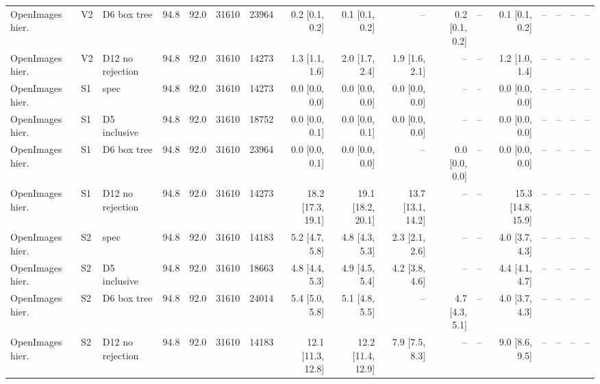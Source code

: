 \begin{tabular}{lllrrrrrrrrrrrrrl}
OpenImages hier. & V2 & D6 box tree & 94.8 & 92.0 & 31610 & 23964 & 0.2 \scriptsize{[0.1, 0.2]} & 0.1 \scriptsize{[0.1, 0.2]} & -- & 0.2 \scriptsize{[0.1, 0.2]} & -- & 0.1 \scriptsize{[0.1, 0.2]} & -- & -- & -- & -- \\
OpenImages hier. & V2 & D12 no rejection & 94.8 & 92.0 & 31610 & 14273 & 1.3 \scriptsize{[1.1, 1.6]} & 2.0 \scriptsize{[1.7, 2.4]} & 1.9 \scriptsize{[1.6, 2.1]} & -- & -- & 1.2 \scriptsize{[1.0, 1.4]} & -- & -- & -- & -- \\
OpenImages hier. & S1 & spec & 94.8 & 92.0 & 31610 & 14273 & 0.0 \scriptsize{[0.0, 0.0]} & 0.0 \scriptsize{[0.0, 0.0]} & 0.0 \scriptsize{[0.0, 0.0]} & -- & -- & 0.0 \scriptsize{[0.0, 0.0]} & -- & -- & -- & -- \\
OpenImages hier. & S1 & D5 inclusive & 94.8 & 92.0 & 31610 & 18752 & 0.0 \scriptsize{[0.0, 0.1]} & 0.0 \scriptsize{[0.0, 0.1]} & 0.0 \scriptsize{[0.0, 0.0]} & -- & -- & 0.0 \scriptsize{[0.0, 0.0]} & -- & -- & -- & -- \\
OpenImages hier. & S1 & D6 box tree & 94.8 & 92.0 & 31610 & 23964 & 0.0 \scriptsize{[0.0, 0.1]} & 0.0 \scriptsize{[0.0, 0.0]} & -- & 0.0 \scriptsize{[0.0, 0.0]} & -- & 0.0 \scriptsize{[0.0, 0.0]} & -- & -- & -- & -- \\
OpenImages hier. & S1 & D12 no rejection & 94.8 & 92.0 & 31610 & 14273 & 18.2 \scriptsize{[17.3, 19.1]} & 19.1 \scriptsize{[18.2, 20.1]} & 13.7 \scriptsize{[13.1, 14.2]} & -- & -- & 15.3 \scriptsize{[14.8, 15.9]} & -- & -- & -- & -- \\
OpenImages hier. & S2 & spec & 94.8 & 92.0 & 31610 & 14183 & 5.2 \scriptsize{[4.7, 5.8]} & 4.8 \scriptsize{[4.3, 5.3]} & 2.3 \scriptsize{[2.1, 2.6]} & -- & -- & 4.0 \scriptsize{[3.7, 4.3]} & -- & -- & -- & -- \\
OpenImages hier. & S2 & D5 inclusive & 94.8 & 92.0 & 31610 & 18663 & 4.8 \scriptsize{[4.4, 5.3]} & 4.9 \scriptsize{[4.5, 5.4]} & 4.2 \scriptsize{[3.8, 4.6]} & -- & -- & 4.4 \scriptsize{[4.1, 4.7]} & -- & -- & -- & -- \\
OpenImages hier. & S2 & D6 box tree & 94.8 & 92.0 & 31610 & 24014 & 5.4 \scriptsize{[5.0, 5.8]} & 5.1 \scriptsize{[4.8, 5.5]} & -- & 4.7 \scriptsize{[4.3, 5.1]} & -- & 4.0 \scriptsize{[3.7, 4.3]} & -- & -- & -- & -- \\
OpenImages hier. & S2 & D12 no rejection & 94.8 & 92.0 & 31610 & 14183 & 12.1 \scriptsize{[11.3, 12.8]} & 12.2 \scriptsize{[11.4, 12.9]} & 7.9 \scriptsize{[7.5, 8.3]} & -- & -- & 9.0 \scriptsize{[8.6, 9.5]} & -- & -- & -- & -- \\

\end{tabular}
